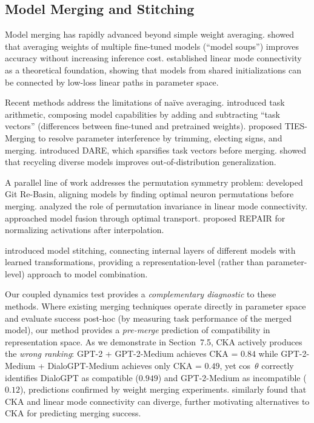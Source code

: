 \documentclass[10pt]{article} %
\theoremstyle{plain}
\theoremstyle{definition}
\theoremstyle{remark}
\begin{document}
\subsection{Model Merging and Stitching}

Model merging has rapidly advanced beyond simple weight averaging. \citet{wortsman2022model} showed that averaging weights of multiple fine-tuned models (``model soups'') improves accuracy without increasing inference cost. \citet{frankle2020linear} established linear mode connectivity as a theoretical foundation, showing that models from shared initializations can be connected by low-loss linear paths in parameter space.

Recent methods address the limitations of na\"ive averaging. \citet{ilharco2023task} introduced task arithmetic, composing model capabilities by adding and subtracting ``task vectors'' (differences between fine-tuned and pretrained weights). \citet{yadav2023ties} proposed TIES-Merging to resolve parameter interference by trimming, electing signs, and merging. \citet{yu2024dare} introduced DARE, which sparsifies task vectors before merging. \citet{davari2023model} showed that recycling diverse models improves out-of-distribution generalization.

A parallel line of work addresses the permutation symmetry problem: \citet{ainsworth2023git} developed Git Re-Basin, aligning models by finding optimal neuron permutations before merging. \citet{entezari2022role} analyzed the role of permutation invariance in linear mode connectivity. \citet{singh2020model} approached model fusion through optimal transport. \citet{jordan2023repair} proposed REPAIR for normalizing activations after interpolation.

\citet{bansal2021stitching} introduced model stitching, connecting internal layers of different models with learned transformations, providing a representation-level (rather than parameter-level) approach to model combination.

Our coupled dynamics test provides a \textit{complementary diagnostic} to these methods. Where existing merging techniques operate directly in parameter space and evaluate success post-hoc (by measuring task performance of the merged model), our method provides a \textit{pre-merge} prediction of compatibility in representation space. As we demonstrate in Section~7.5, CKA actively produces the \textit{wrong ranking}: GPT-2 + GPT-2-Medium achieves CKA = $0.84$ while GPT-2-Medium + DialoGPT-Medium achieves only CKA = $0.49$, yet cos~$\theta$ correctly identifies DialoGPT as compatible ($0.949$) and GPT-2-Medium as incompatible ($0.12$), predictions confirmed by weight merging experiments. \citet{zhou2024crosslmc} similarly found that CKA and linear mode connectivity can diverge, further motivating alternatives to CKA for predicting merging success.
\end{document}
